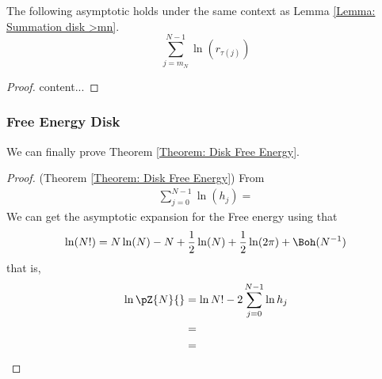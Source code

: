 \begin{proposicao}
	The following asymptotic holds under the same context as Lemma \ref{Lemma: Summation disk >mn}.
	\begin{equation}
		\sum_{j=m_N}^{N-1} \ln(r_{\tau(j)})
	\end{equation}
\end{proposicao}
\begin{proof}
	content...
\end{proof}

\subsubsection{Free Energy Disk}


We can finally prove Theorem \ref{Theorem: Disk Free Energy}.

\begin{proof} (Theorem \ref{Theorem: Disk Free Energy})
	From
	\begin{multline}
		\sum_{j=0}^{N-1} \ln(h_j) = 
	\end{multline}
	We can get the asymptotic expansion for the Free energy using that
	\begin{equation}
		\ln(N!) = N\ln(N) - N + \frac{1}{2} \ln(N) + \frac{1}{2} \ln(2 \pi) + \Boh(N^{-1})
	\end{equation}
	that is,
	\begin{align}
		\ln \pZ{N}{} & = \ln{N!} - 2 \sum_{j=0}^{N-1} \ln{h_j} \\
		& = \\
		& =
	\end{align}
\end{proof}
